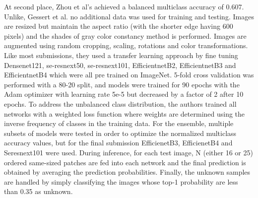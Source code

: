 At second place, Zhou et al's \cite{isic2019second} achieved a balanced multiclass accuracy of 0.607. Unlike, Gessert et al. no additional data was used for training and testing. Images are resized but maintain the aspect ratio (with the shorter edge having 600 pixels) and the shades of gray color constancy method \cite{shadesgray} is performed. Images are augmented using random cropping, scaling, rotations and color transformations. Like most submissions, they used a transfer learning approach by fine tuning Densenet121, se-resnext50, se-resnext101, EfficientnetB2, EfficientnetB3 and EfficientnetB4 which were all pre trained on ImageNet. 5-fold cross validation was performed with a 80-20 split, and models were trained for 90 epochs with the Adam optimizer \cite{adam} with learning rate 5e-5 but decreased by a factor of 2 after 10 epochs. To address the unbalanced class distribution, the authors trained all networks with a weighted loss function where weights are determined using the inverse frequency of classes in the training data. For the ensemble, multiple subsets of models were tested in order to optimize the normalized multiclass accuracy values, but for the final submission EfficienetB3, EfficienetB4 and Seresnext101 were used. During inference, for each test image, N (either 16 or 25) ordered same-sized patches are fed into each network and the final prediction is obtained by averaging the prediction probabilities. Finally, the unknown samples are handled by simply classifying the images whose top-1 probability are less than 0.35 as unknown.\par

